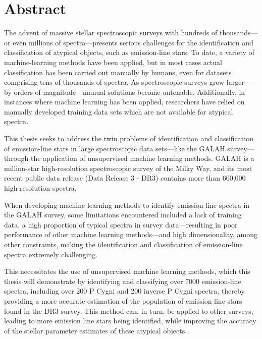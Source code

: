 \chapter{Abstract}

The advent of massive stellar spectroscopic surveys with hundreds of thousands—or even millions of spectra—presents serious challenges for the identification and classification of atypical objects, such as emission-line stars. To date, a variety of machine-learning methods have been applied, but in most cases actual classification has been carried out manually by humans, even for datasets comprising tens of thousands of spectra. As spectroscopic surveys grow larger—by orders of magnitude—manual solutions become untenable. Additionally, in instances where machine learning has been applied, researchers have relied on manually developed training data sets which are not available for atypical spectra. 

This thesis seeks to address the twin problems of identification and classification of emission-line stars in large spectroscopic data sets—like the GALAH survey—through the application of unsupervised machine learning methods. GALAH is a million-star high-resolution spectroscopic survey of the Milky Way, and its most recent public data release (Data Release 3 - DR3) contains more than 600,000 high-resolution spectra. 

When developing machine learning methods to identify emission-line spectra in the GALAH survey, some limitations encountered included a lack of training data, a high proportion of typical spectra in survey data—resulting in poor performance of other machine learning methods—and high dimensionality, among other constraints, making the identification and classification of emission-line spectra extremely challenging. 

This necessitates the use of unsupervised machine learning methods, which this thesis will demonstrate by identifying and classifying over 7000 emission-line spectra, including over 200 P Cygni and 200 inverse P Cygni spectra, thereby providing a more accurate estimation of the population of emission line stars found in the DR3 survey. This method can, in turn, be applied to other surveys, leading to more emission line stars being identified, while improving the accuracy of the stellar parameter estimates of these atypical objects.


